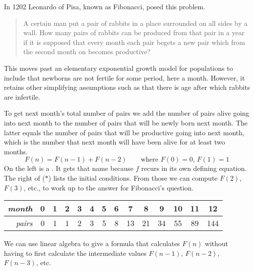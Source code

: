 
In 1202 Leonardo of Pisa, known as Fibonacci, posed this problem.
\begin{quotation}
  \noindent A certain man put a pair of rabbits in a place
  surrounded on all sides by a wall.
  How many pairs of rabbits can be produced from that pair in a year if it
  is supposed that every month each pair begets a new pair which from the
  second month on becomes productive?
\end{quotation}
This moves past an elementary exponential growth model for
populations
to include that newborns are not fertile for some period, here a month.
However, it retains other simplifying assumptions such as  
that there is age after which rabbits are infertile.

To get next month's total number of pairs 
we add the number of pairs alive going into next month to
the number of pairs that will be newly born next month.
The latter equals the number of pairs that will be 
productive going into next month, which is the number that next month will 
have been alive for at least two months.
\begin{equation*}
  F(n)=F(n-1)+F(n-2)  \qquad \text{where $F(0)=0$, $F(1)=1$}
  \tag{$*$}
\end{equation*}
On the left is a
.
It gets that name 
because $f$ recurs in its own defining equation.
The right of ($*$) lists the initial conditions.
From those we can compute $F(2)$, $F(3)$, etc., to work up to the answer
for Fibonacci's question.
\begin{center}
  \begin{tabular}{r|ccccccccccccc}
    \textit{month}
     &0  &1  &2  &3  &4  &5  &6  &7  &8  &9  &10  &11  &12  \\ \hline
    \textit{pairs}
     &0  &1  &1  &2  &3  &5  &8  &13  &21  &34  &55  &89  &144   
  \end{tabular}
\end{center}
We can use linear algebra to give a formula that
calculates $F(n)$ without having to first calculate the intermediate 
values $F(n-1)$, $F(n-2)$, $F(n-3)$, etc.

